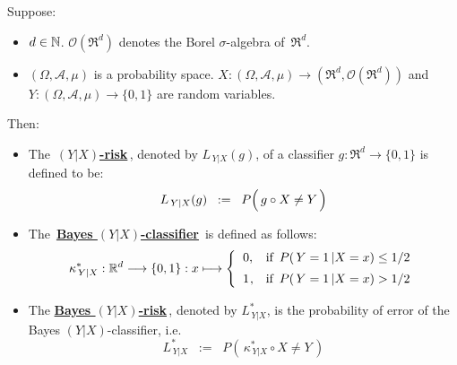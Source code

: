 \vskip 0.5cm
\begin{definition}
\mbox{}\vskip 0.1cm
\noindent
Suppose:
\begin{itemize}
\item
	$d \in \mathbb{N}$.
	$\mathcal{O}(\Re^{d})$ denotes the Borel $\sigma$-algebra of \,$\Re^{d}$.
\item
	$(\Omega,\mathcal{A},\mu)$ is a probability space.
	$X : (\Omega,\mathcal{A},\mu) \longrightarrow (\Re^{d},\mathcal{O}(\Re^{d}))$ and\,
	$Y : (\Omega,\mathcal{A},\mu) \longrightarrow \{0,1\}$
	are random variables.
\end{itemize}
Then:
\begin{itemize}
\item
	The
	\,\underline{\textbf{$(Y \vert X)$-risk}}\,,
	denoted by $L_{\,Y \vert X}(g)$, of a classifier
	$g : \Re^{d} \longrightarrow \{0,1\}$ is defined to be:
	\begin{equation*}
	L_{\,Y \vert X}(g) \;\; := \;\; P\!\left(\,g \circ X \overset{{\color{white}.}}{\neq} Y\,\right)
	\end{equation*}
\item
	The
	\,\underline{\textbf{Bayes $(Y \vert X)$-classifier}}\,
	is defined as follows:
	\begin{equation*}
	\kappa^{*}_{\,Y \vert X} : \Re^{d} \longrightarrow \{0,1\} : x \longmapsto
		\left\{\begin{array}{cl}
			0, & \textnormal{if \,$P(\,Y=1 \,\vert X = x) \leq 1/2$}
			\\
			\overset{{\color{white}-}}{1}, & \textnormal{if \,$P(\,Y=1 \,\vert X = x) > 1/2$}
		\end{array}\right.
	\end{equation*}
\item
	The \underline{\textbf{Bayes $(Y \vert X)$-risk}}\,,
	denoted by $L^{*}_{\,Y \vert X}$, is the probability of error of the Bayes $(Y \vert X)$-classifier, i.e.
	\begin{equation*}
	L^{*}_{\,Y \vert X} \;\; := \;\; P\!\left(\, \kappa^{*}_{\,Y \vert X} \circ X \neq Y \,\right)
	\end{equation*}
\end{itemize}
\end{definition}


